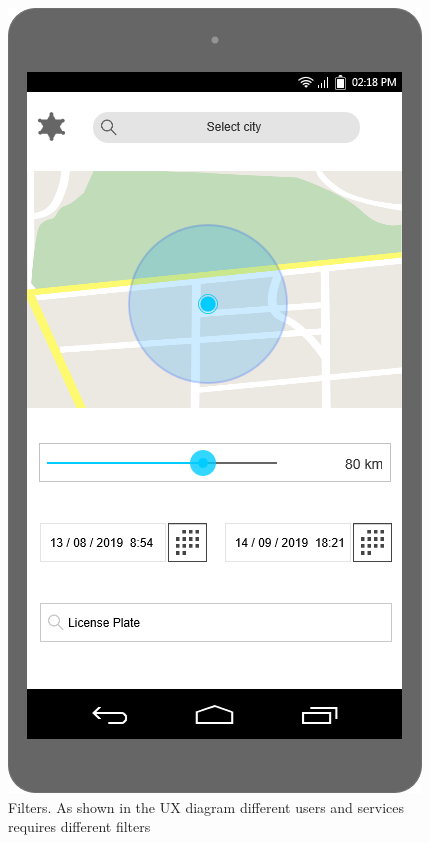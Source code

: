 \documentclass[./main.tex]{subfiles}
\begin{document}
\begin{figure}
    \centering
    \begin{minipage}[t]{\mockupdimension}
        \includegraphics[width=\textwidth]{resources/Mockups/filter1}
        \caption{Filters. As shown in the UX diagram different users and services requires different                                                   filters}

\end{minipage}
\end{figure}
\end{document}
